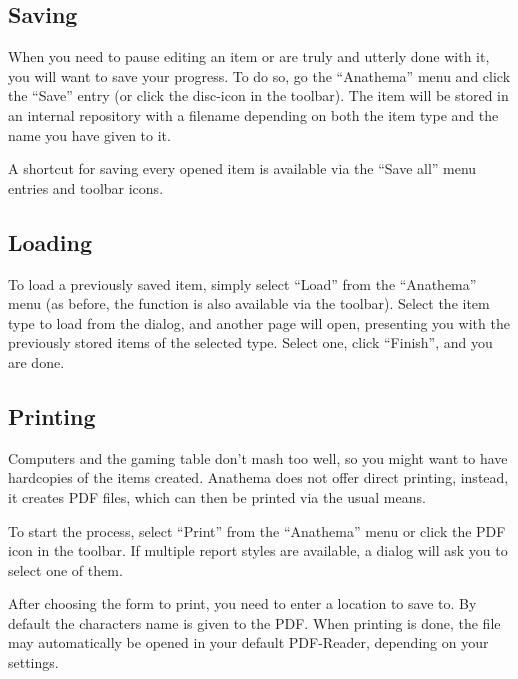 \subsection{Saving}
When you need to pause editing an item or are truly and utterly done with it, you will want to save your progress. To do so, go the ``Anathema'' menu and click the ``Save'' entry (or click the disc-icon in the toolbar). The item will be stored in an internal repository with a filename depending on both the item type and the name you have given to it. 

A shortcut for saving every opened item is available via the ``Save all'' menu entries and toolbar icons.

\subsection{Loading}
To load a previously saved item, simply select ``Load'' from the ``Anathema'' menu (as before, the function is also available via the toolbar). Select the item type to load from the dialog, and another page will open, presenting you with the previously stored items of the selected type. Select one, click ``Finish'', and you are done.

\subsection{Printing}
Computers and the gaming table don't mash too well, so you might want to have hardcopies of the items created. Anathema does not offer direct printing, instead, it creates PDF files, which can then be printed via the usual means.

To start the process, select "`Print"' from the "`Anathema"' menu or click the PDF icon in the toolbar. If multiple report styles are available, a dialog will ask you to select one of them. 

After choosing the form to print, you need to enter a location to save to. By default the characters name is given to the PDF. When printing is done, the file may automatically be opened in your default PDF-Reader, depending on your settings.
